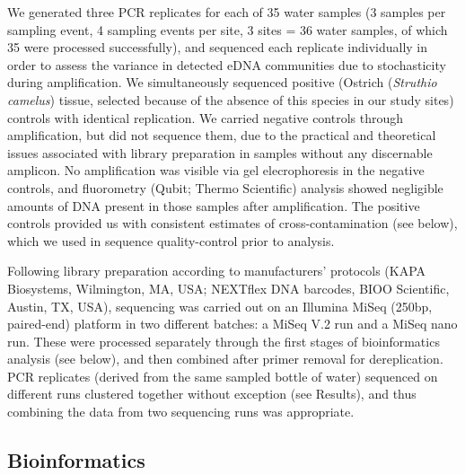 \documentclass[fleqn,10pt,lineno]{wlpeerj} %
\begin{document}
We generated three PCR replicates for each of 35 water samples (3
samples per sampling event, 4 sampling events per site, 3 sites = 36
water samples, of which 35 were processed successfully), and sequenced
each replicate individually in order to assess the variance in detected
eDNA communities due to stochasticity during amplification. We
simultaneously sequenced positive (Ostrich (\emph{Struthio camelus})
tissue, selected because of the absence of this species in our study
sites) controls with identical replication. We carried negative controls
through amplification, but did not sequence them, due to the practical
and theoretical issues associated with library preparation in samples
without any discernable amplicon. No amplification was visible via gel
elecrophoresis in the negative controls, and fluorometry (Qubit; Thermo
Scientific) analysis showed negligible amounts of DNA present in those
samples after amplification. The positive controls provided us with
consistent estimates of cross-contamination (see below), which we used
in sequence quality-control prior to analysis.

Following library preparation according to manufacturers' protocols
(KAPA Biosystems, Wilmington, MA, USA; NEXTflex DNA barcodes, BIOO
Scientific, Austin, TX, USA), sequencing was carried out on an Illumina
MiSeq (250bp, paired-end) platform in two different batches: a MiSeq V.2
run and a MiSeq nano run. These were processed separately through the
first stages of bioinformatics analysis (see below), and then combined
after primer removal for dereplication. PCR replicates (derived from the
same sampled bottle of water) sequenced on different runs clustered
together without exception (see Results), and thus combining the data
from two sequencing runs was appropriate.

\subsection{Bioinformatics}\label{bioinformatics}
\end{document}
